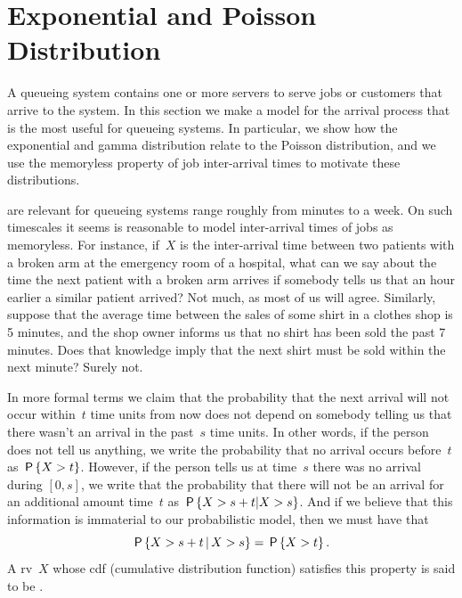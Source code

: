 \documentclass[queueing-book.tex]{subfiles}
\begin{document}
\section{Exponential and Poisson Distribution}
\label{sec:expon-poiss-distr}

A queueing system contains one or more servers to serve jobs or customers that arrive to the system.
In this section we make a model for the arrival process that is the most useful for queueing systems.
In particular, we show how the exponential and gamma distribution relate to the Poisson distribution, and we use the memoryless property of job inter-arrival times to motivate these distributions.



 are relevant for queueing systems range roughly from minutes to a week.
On such timescales it seems is reasonable to model inter-arrival times of jobs as memoryless.
For instance, if~$X$ is the inter-arrival time between two patients with a broken arm at the emergency room of a hospital, what can we say about the time the next patient with a broken arm arrives if somebody tells us that an hour earlier a similar patient arrived?
Not much, as most of us will agree.
Similarly, suppose that the average time between the sales of some shirt in a clothes shop is 5 minutes, and the shop owner informs us that no shirt has been sold the past 7 minutes.
Does that knowledge imply that the next shirt must be sold within the next minute?
Surely not.

In more formal terms we claim that the probability that the next arrival will not occur within~$t$ time units from now does not depend on somebody telling us that there wasn't an arrival in the past~$s$ time units.
In other words, if the person does not tell us anything, we write the probability that no arrival occurs before~$t$ as $\P{X>t}$.
However, if the person tells us at time~$s$ there was no arrival during $[0,s]$, we write that the probability that there will not be an arrival for an additional amount time~$t$ as $\P{X>s+t|X>s}$.
And if we believe that this information is immaterial to our probabilistic model, then we must have that
\begin{equation}\label{eq:29}
 \P{X > s+t \given X>s} = \P{X>t}.
\end{equation}
A rv~$X$ whose cdf (cumulative distribution function) satisfies this property is said to be .
\end{document}
